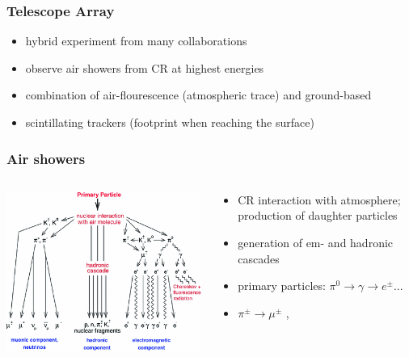 \documentclass[aspectratio=1610, 9pt]{beamer}
\begin{document}
\begin{frame}\frametitle{Telescope Array}
  \begin{itemize}
    \item hybrid experiment from many collaborations
    \item observe air showers from CR at highest energies
    \item combination of air-flourescence (atmospheric trace) and ground-based
    \item scintillating trackers (footprint when reaching the surface)
  \end{itemize}
\end{frame}

\begin{frame}\frametitle{Air showers}
  \begin{columns}
    \begin{column}[c]{0.48\textwidth}
      \includegraphics{shower.png}
    \end{column}
    \begin{column}[c]{0.48\textwidth}
      \begin{itemize}
        \item CR interaction with atmosphere; production of daughter particles
        \item generation of em- and hadronic cascades
        \item primary particles: $\pi^0 \to \gamma \to e^{\pm}$...
        \item $\pi^{\pm} \to \mu^{\pm}$ , \nu
      \end{itemize}
    \end{column}
  \end{columns}
\end{frame}
\end{document}

